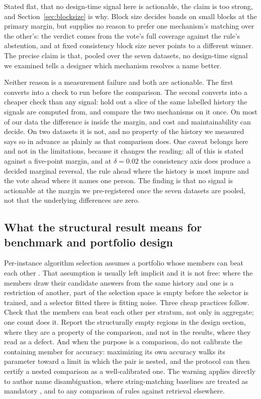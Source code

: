 \documentclass[11pt]{article}
\begin{document}
Stated flat, that no design-time signal here is actionable, the claim is too
strong, and Section~\ref{sec:blocksize} is why. Block size decides bands on
small blocks at the primary margin, but supplies no reason to prefer one
mechanism's matching over the other's: the verdict comes from the vote's full
coverage against the rule's abstention, and at fixed consistency block size
never points to a different winner. The precise claim is that, pooled over the seven datasets, no design-time signal we examined tells a designer which mechanism resolves a name better.

Neither reason is a measurement failure and both are actionable. The first
converts into a check to run before the comparison. The second converts into
a cheaper check than any signal: hold out a slice of the same labelled history
the signals are computed from, and compare the two mechanisms on it once. On
most of our data the difference is inside the margin, and cost and
maintainability can decide. On two datasets it is not, and no property of the
history we measured says so in advance as plainly as that comparison does.
One caveat belongs here and not in the
limitations, because it changes the reading: all of this is stated against a
five-point margin, and at $\delta = 0.02$ the consistency axis does produce a
decided marginal reversal, the rule ahead where the history is most impure and
the vote ahead where it names one person. The finding is that no signal is actionable at the margin we pre-registered once the seven datasets are pooled, not that the underlying differences are zero.

\subsection{What the structural result means for benchmark and portfolio
design}
\label{sec:portfolio}

Per-instance algorithm selection assumes a portfolio whose members can beat
each other \citep{rice1976, smithmiles2009, barbudo2023}. That assumption is
usually left implicit and it is not free: where the members draw their
candidate answers from the same history and one is a restriction of another,
part of the selection space is empty before the selector is trained, and a
selector fitted there is fitting noise. Three cheap practices follow. Check that the members can beat each other per
stratum, not only in aggregate; one count does it. Report the structurally
empty regions in the design section, where they are a property of the
comparison, and not in the results, where they read as a defect. And when the
purpose is a comparison, do not calibrate the containing member for accuracy: maximizing its own accuracy walks its parameter toward a limit in which the pair is nested, and the protocol can then certify a nested comparison as a well-calibrated one. The
warning applies directly to author name disambiguation, where string-matching
baselines are treated as mandatory \citep{backes2018, kimkim2020}, and to any
comparison of rules against retrieval elsewhere.
\end{document}
